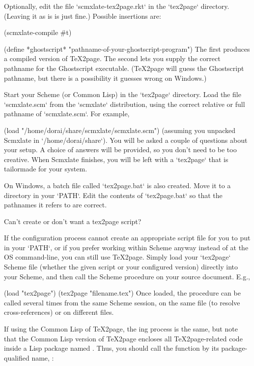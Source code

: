 {{{{{{{{{Optionally, edit the file `scmxlate-tex2page.rkt` in the
`tex2page` directory. (Leaving it as is is just fine.)
Possible insertions are:

\begintts
(scmxlate-compile #t)

(define *ghostscript* "pathname-of-your-ghostscript-program")
\endtt
%
The first produces a compiled version of
\TeX2page.   The second lets you supply the
correct pathname for the Ghostscript executable.
(\TeX2page will guess the Ghostscript pathname,
but there is a possibility it guesses wrong on
Windows.)

Start your Scheme (or Common Lisp) in the
`tex2page` directory.   Load the file
`scmxlate.scm` from the
`scmxlate` distribution, using the correct relative
or full pathname of `scmxlate.scm`.  For example,

\begintts
(load "/home/dorai/share/scmxlate/scmxlate.scm")
\endtt
%
(assuming you unpacked Scmxlate in
`/home/dorai/share`).  You will be asked a couple
of questions about your setup.  A choice of answers
will be provided, so you don’t need to be too creative.
When Scmxlate finishes, you will be left with a
`tex2page` that is tailormade for your system.

On Windows, a batch file called `tex2page.bat`
is also created.  Move it to a directory in your
`PATH`.  Edit the contents of `tex2page.bat` so
that the pathnames it refers to are correct.

\iffalse
\beginsection Can’t create or don’t want a {tex2page
script?}

If the configuration process cannot create an
appropriate script file for you to put in your
`PATH`, or if you prefer working within Scheme
anyway instead of at the OS command-line,
you can still use \TeX2page.  Simply load
your `tex2page` Scheme file
(whether the given script or your configured version)
directly into
your Scheme, and then call the Scheme
procedure  on your source document.  E.g.,

\begintts
(load "tex2page")
(tex2page "filename.tex")
\endtt
Once loaded, the procedure  can be called several times from
the same Scheme session, on the same file (to resolve cross-references)
or on different files.

If using the Common Lisp of \TeX2page, the ing process is the same, but note that
the Common Lisp version of \TeX2page encloses all \TeX2page-related code
inside a Lisp package named .  Thus, you should call the
function  by its package-qualified name, :

}}}}}}}}}
